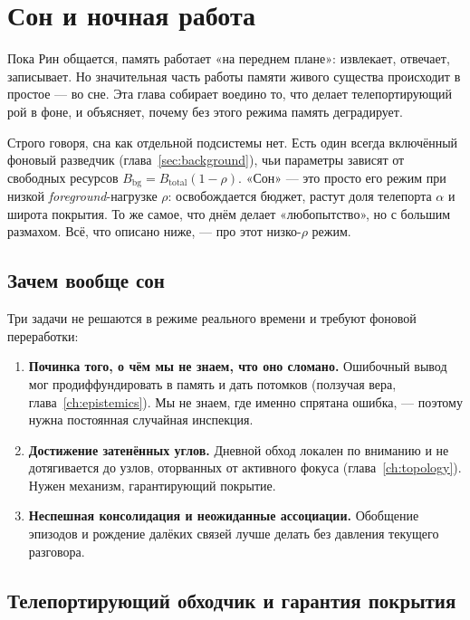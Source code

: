 \chapter{Сон и ночная работа}
\label{ch:sleep}

Пока Рин общается, память работает «на переднем плане»: извлекает, отвечает,
записывает. Но значительная часть работы памяти живого существа происходит в
простое --- во сне. Эта глава собирает воедино то, что делает
телепортирующий рой в фоне, и объясняет, почему без этого режима память
деградирует.

\begin{intuition}
Строго говоря, сна как отдельной подсистемы нет. Есть один всегда включённый
фоновый разведчик (глава~\ref{sec:background}), чьи параметры зависят от
свободных ресурсов $B_{\text{bg}} = B_{\text{total}}(1 - \rho)$. «Сон» ---
это просто его режим при низкой \textit{foreground}-нагрузке $\rho$:
освобождается бюджет, растут доля телепорта $\alpha$ и широта покрытия. То
же самое, что днём делает «любопытство», но с большим размахом. Всё, что
описано ниже, --- про этот низко-$\rho$ режим.
\end{intuition}

\section{Зачем вообще сон}

Три задачи не решаются в режиме реального времени и требуют фоновой
переработки:
\begin{enumerate}
\item \textbf{Починка того, о чём мы не знаем, что оно сломано.} Ошибочный
вывод мог продиффундировать в память и дать потомков (ползучая вера,
глава~\ref{ch:epistemics}). Мы не знаем, где именно спрятана ошибка, ---
поэтому нужна постоянная случайная инспекция.
\item \textbf{Достижение затенённых углов.} Дневной обход локален по вниманию и
не дотягивается до узлов, оторванных от активного фокуса
(глава~\ref{ch:topology}). Нужен механизм, гарантирующий покрытие.
\item \textbf{Неспешная консолидация и неожиданные ассоциации.} Обобщение
эпизодов и рождение далёких связей лучше делать без давления текущего
разговора.
\end{enumerate}

\section{Телепортирующий обходчик и гарантия покрытия}

